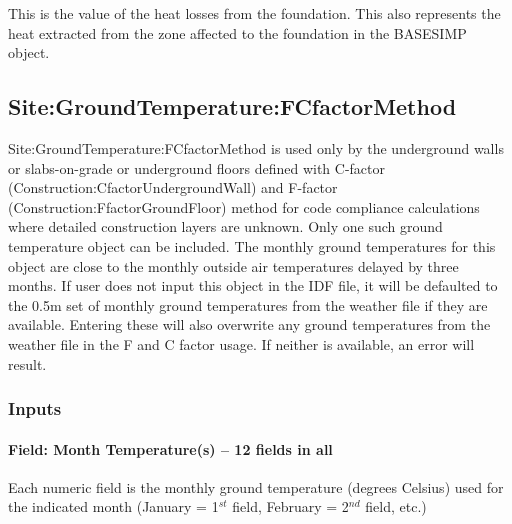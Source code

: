 This is the value of the heat losses from the foundation. This also represents the heat extracted from the zone affected to the foundation in the BASESIMP object.



























\subsection{Site:GroundTemperature:FCfactorMethod}\label{sitegroundtemperaturefcfactormethod}

Site:GroundTemperature:FCfactorMethod is used only by the underground walls or slabs-on-grade or underground floors defined with C-factor (Construction:CfactorUndergroundWall) and F-factor (Construction:FfactorGroundFloor) method for code compliance calculations where detailed construction layers are unknown. Only one such ground temperature object can be included. The monthly ground temperatures for this object are close to the monthly outside air temperatures delayed by three months. If user does not input this object in the IDF file, it will be defaulted to the 0.5m set of monthly ground temperatures from the weather file if they are available. Entering these will also overwrite any ground temperatures from the weather file in the F and C factor usage. If neither is available, an error will result.

\subsubsection{Inputs}\label{inputs-18-004}

\paragraph{Field: Month Temperature(s) -- 12 fields in all}\label{field-month-temperatures-12-fields-in-all-3}

Each numeric field is the monthly ground temperature (degrees Celsius) used for the indicated month (January = 1\(^{st}\) field, February = 2\(^{nd}\) field, etc.)

